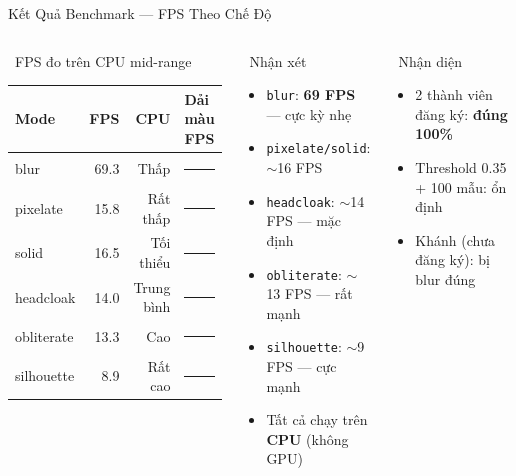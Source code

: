 \documentclass[aspectratio=169, 11pt]{beamer}
\newcommand{\cmark}{\textcolor{darkgreen}{\ding{51}}}
\begin{document}
\begin{frame}{Kết Quả Benchmark --- FPS Theo Chế Độ}
\begin{columns}[T]
\begin{block}{\faChartBar\ FPS đo trên CPU mid-range}
\footnotesize\renewcommand{\arraystretch}{1.35}
\begin{tabular}{lrrl}
\textbf{Mode} & \textbf{FPS} & \textbf{CPU} & \textbf{Dải màu FPS} \\
\hline
blur        & 69.3 & Thấp    & \textcolor{blue!70}{\rule{5.5cm}{3pt}} \\
pixelate    & 15.8 & Rất thấp & \textcolor{teal!70}{\rule{1.2cm}{3pt}} \\
solid       & 16.5 & Tối thiểu & \textcolor{teal!50}{\rule{1.3cm}{3pt}} \\
headcloak   & 14.0 & Trung bình & \textcolor{orange!70}{\rule{1.1cm}{3pt}} \\
obliterate  & 13.3 & Cao     & \textcolor{orange!90}{\rule{1.05cm}{3pt}} \\
silhouette  &  8.9 & Rất cao & \textcolor{red!70}{\rule{0.7cm}{3pt}} \\
\end{tabular}
\end{block}
\begin{block}{\cmark\ Nhận xét}
\begin{itemize}\footnotesize
  \item \texttt{blur}: \textbf{69 FPS} --- cực kỳ nhẹ
  \item \texttt{pixelate/solid}: $\sim$16 FPS
  \item \texttt{headcloak}: $\sim$14 FPS --- mặc định
  \item \texttt{obliterate}: $\sim$13 FPS --- rất mạnh
  \item \texttt{silhouette}: $\sim$9 FPS --- cực mạnh
  \item Tất cả chạy trên \textbf{CPU} (không GPU)
\end{itemize}
\end{block}
\begin{block}{\cmark\ Nhận diện}
\begin{itemize}\footnotesize
  \item 2 thành viên đăng ký: \textbf{đúng 100\%}
  \item Threshold 0.35 + 100 mẫu: ổn định
  \item Khánh (chưa đăng ký): bị blur đúng
\end{itemize}
\end{block}
\end{columns}
\end{frame}
\end{document}
